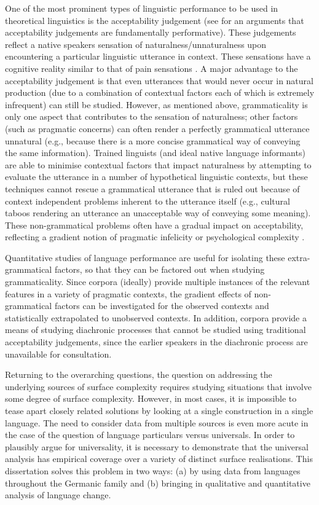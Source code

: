 One of the most prominent types of linguistic performance to be used in theoretical linguistics is the acceptability judgement (see \citealt{Stroud.2012,Phillips.2013, Phillips.2013b, Phillips.2013c} for an arguments that acceptability judgements are fundamentally performative). These judgements reflect a native speakers sensation of naturalness/unnaturalness upon encountering a particular linguistic utterance in context. These sensations have a cognitive reality similar to that of pain sensations \citep{Schutze.2014}. A major advantage to the acceptability judgement is that even utterances that would never occur in natural production (due to a combination of contextual factors each of which is extremely infrequent) can still be studied. However, as mentioned above, grammaticality is only one aspect that contributes to the sensation of naturalness; other factors (such as pragmatic concerns) can often render a perfectly grammatical utterance unnatural (e.g., because there is a more concise grammatical way of conveying the same information). Trained linguists (and ideal native language informants) are able to minimise contextual factors that impact naturalness by attempting to evaluate the utterance in a number of hypothetical linguistic contexts, but these techniques cannot rescue a grammatical utterance that is ruled out because of context independent problems inherent to the utterance itself (e.g., cultural taboos rendering an utterance an unacceptable way of conveying some meaning). These non-grammatical problems often have a gradual impact on acceptability, reflecting a gradient notion of pragmatic infelicity or psychological complexity \citep{Bresnan.2007,Bresnan.2010,Schutze.2014}.

Quantitative studies of language performance are useful for isolating these extra-grammatical factors, so that they can be factored out when studying grammaticality. Since corpora (ideally) provide multiple instances of the relevant features in a variety of pragmatic contexts, the gradient effects of non-grammatical factors can be investigated for the observed contexts and statistically extrapolated to unobserved contexts. In addition, corpora provide a means of studying diachronic processes that cannot be studied using traditional acceptability judgements, since the earlier speakers in the diachronic process are unavailable for consultation. 


Returning to the overarching questions, the question on addressing the underlying sources of surface complexity requires studying situations that involve some degree of surface complexity. However, in most cases, it is impossible to tease apart closely related solutions by looking at a single construction in a single language. The need to consider data from multiple sources is even more acute in the case of the question of language particulars versus universals. In order to plausibly argue for universality, it is necessary to demonstrate that the universal analysis has empirical coverage over a variety of distinct surface realisations. This dissertation solves this problem in two ways: (a) by using data from languages throughout the Germanic family and (b) bringing in qualitative and quantitative analysis of language change.

